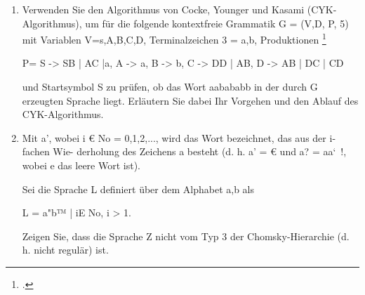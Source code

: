 \documentclass{bschlangaul-aufgabe}
\begin{document}

\begin{enumerate}

\item Verwenden Sie den Algorithmus von Cocke, Younger und Kasami
(CYK-Algorithmus), um für die folgende kontextfreie Grammatik G = (V,D,
P, 5) mit Variablen V={s,A,B,C,D}, Terminalzeichen 3 = {a,b},
Produktionen
\footcite{examen:46115:2021:03}

P={
S -> SB | AC |a,
A -> a,
B -> b,
C -> DD | AB,
D -> AB | DC | CD
}

und Startsymbol S zu prüfen, ob das Wort aabababb in der durch G
erzeugten Sprache liegt. Erläutern Sie dabei Ihr Vorgehen und den Ablauf
des CYK-Algorithmus.


\item Mit a’, wobei i € No = {0,1,2,...}, wird das Wort bezeichnet, das
aus der i-fachen Wie- derholung des Zeichens a besteht (d. h. a’ = € und
a? = aa‘~!, wobei e das leere Wort ist).

Sei die Sprache L definiert über dem Alphabet {a,b} als

L = {a"b™ | iE No, i > 1}.

Zeigen Sie, dass die Sprache Z nicht vom Typ 3 der Chomsky-Hierarchie
(d. h. nicht regulär) ist.
\end{enumerate}
\end{document}

